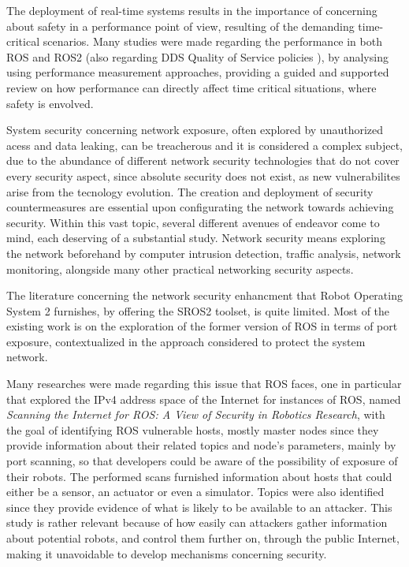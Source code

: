 The deployment of real-time systems results in the importance of concerning about safety in a performance point of view, resulting of the demanding time-critical scenarios. Many studies were made regarding the performance in both ROS and ROS2 (also regarding DDS Quality of Service policies \cite{maruyama2016exploring}), by analysing using performance measurement approaches, providing a guided and supported review on how performance can directly affect time critical situations, where safety is envolved.\cite{maruyama2016exploring, casini2019response} 

System security concerning network exposure, often explored by unauthorized acess and data leaking, can be treacherous and it is considered a complex subject, due to the abundance of different network security technologies that do not cover every security aspect, since absolute security does not exist, as new vulnerabilites arise from the tecnology evolution.\cite{kaeo2004designing} The creation and deployment of security countermeasures are essential upon configurating the network towards achieving security. Within this vast topic, several different avenues of endeavor come to mind, each deserving of a substantial study. Network security means exploring the network beforehand by computer intrusion detection, traffic analysis, network monitoring, alongside many other practical networking security aspects.\cite{marin2005network}

The literature concerning the network security enhancment that Robot Operating System 2 furnishes, by offering the SROS2 toolset, is quite limited. Most of the existing work is on the exploration of the former version of ROS in terms of port exposure, contextualized in the approach considered to protect the system network.  

Many researches were made regarding this issue that ROS faces, one in particular that explored the IPv4 address space of the Internet for instances of ROS, named \textit{Scanning the Internet for ROS: A View of Security in Robotics Research}\cite{8794451}, with the goal of identifying ROS vulnerable hosts, mostly master nodes since they provide information about their related topics and node's parameters, mainly by port scanning, so that developers could be aware of the possibility of exposure of their robots. The performed scans furnished information about hosts that could either be a sensor, an actuator or even a simulator. Topics were also identified since they provide evidence of what is likely to be available to an attacker. This study is rather relevant because of how easily can attackers gather information about potential robots, and control them further on, through the public Internet, making it unavoidable to develop mechanisms concerning security.

